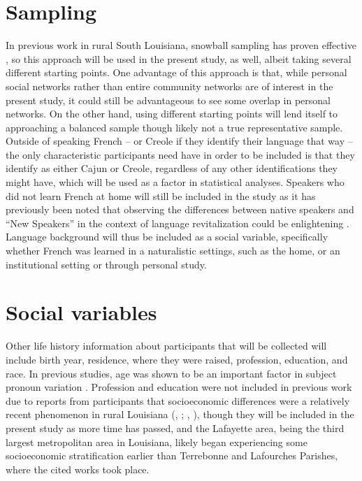   \section{Sampling}
    In previous work in rural South Louisiana, snowball sampling has proven effective \parencite{brown_pronominal_1988, giancarlo_dont_2019, rottet_language_1995}, so this approach will be used in the present study, as well, albeit taking several different starting points.
    One advantage of this approach is that, while personal social networks rather than entire community networks are of interest in the present study, it could still be advantageous to see some overlap in personal networks.
    On the other hand, using different starting points will lend itself to approaching a balanced sample though likely not a true representative sample.
    Outside of speaking French -- or Creole if they identify their language that way -- the only characteristic participants need have in order to be included is that they identify as either Cajun or Creole, regardless of any other identifications they might have, which will be used as a factor in statistical analyses.
    Speakers who did not learn French at home will still be included in the study as it has previously been noted that observing the differences between native speakers and ``New Speakers'' in the context of language revitalization could be enlightening \parencite[p.~21]{gudmestad_variationist_2022}.
    Language background will thus be included as a social variable, specifically whether French was learned in a naturalistic settings, such as the home, or an institutional setting or through personal study.

  \section{Social variables}
    Other life history information about participants that will be collected will include birth year, residence, where they were raised, profession, education, and race.
    In previous studies, age was shown to be an important factor in subject pronoun variation \parencite{rottet_language_1995}.
    Profession and education were not included in previous work due to reports from participants that socioeconomic differences were a relatively recent phenomenon in rural Louisiana (\citeauthor{dajko_ethnic_2009}, \citeyear[p.~66]{dajko_ethnic_2009}; \citeauthor{rottet_language_1995}, \citeyear[p.~64]{rottet_language_1995}), though they will be included in the present study as more time has passed, and the Lafayette area, being the third largest metropolitan area in Louisiana, likely began experiencing some socioeconomic stratification earlier than Terrebonne and Lafourches Parishes, where the cited works took place.

